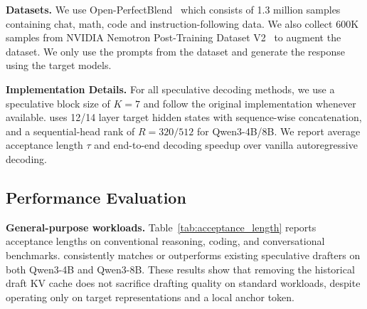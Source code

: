 \textbf{Datasets.}
We use Open-PerfectBlend~\cite{xu2024perfect} which consists of 1.3 million samples containing chat, math, code and instruction-following data. We also collect 600K samples from NVIDIA Nemotron Post-Training Dataset V2~\cite{NemotronPostTrainingDatasetV2} to augment the dataset. We only use the prompts from the dataset and generate the response using the target models.

\textbf{Implementation Details.} For all speculative decoding methods, we use a speculative block size of \(K=7\) and follow the original implementation whenever available. \we uses 12/14 layer target hidden states with sequence-wise concatenation, and a sequential-head rank of \(R=320/512\) for Qwen3-4B/8B. We report average acceptance length \(\tau\) and end-to-end decoding speedup over vanilla autoregressive decoding. 





\subsection{Performance Evaluation}


\textbf{General-purpose workloads.} Table~\ref{tab:acceptance_length}  reports acceptance lengths on conventional reasoning, coding, and conversational benchmarks. \we consistently matches or outperforms existing speculative drafters on both Qwen3-4B and Qwen3-8B. These results show that removing the historical draft KV cache does not sacrifice drafting quality on standard workloads, despite \we operating only on target representations and a local anchor token. 



